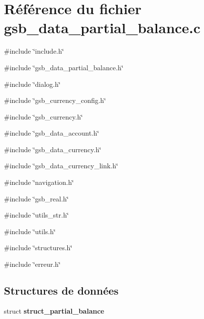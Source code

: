 \section{Référence du fichier gsb\_\-data\_\-partial\_\-balance.c}
\label{gsb__data__partial__balance_8c}
{\ttfamily \#include \char`\"{}include.h\char`\"{}}\par
{\ttfamily \#include \char`\"{}gsb\_\-data\_\-partial\_\-balance.h\char`\"{}}\par
{\ttfamily \#include \char`\"{}dialog.h\char`\"{}}\par
{\ttfamily \#include \char`\"{}gsb\_\-currency\_\-config.h\char`\"{}}\par
{\ttfamily \#include \char`\"{}gsb\_\-currency.h\char`\"{}}\par
{\ttfamily \#include \char`\"{}gsb\_\-data\_\-account.h\char`\"{}}\par
{\ttfamily \#include \char`\"{}gsb\_\-data\_\-currency.h\char`\"{}}\par
{\ttfamily \#include \char`\"{}gsb\_\-data\_\-currency\_\-link.h\char`\"{}}\par
{\ttfamily \#include \char`\"{}navigation.h\char`\"{}}\par
{\ttfamily \#include \char`\"{}gsb\_\-real.h\char`\"{}}\par
{\ttfamily \#include \char`\"{}utils\_\-str.h\char`\"{}}\par
{\ttfamily \#include \char`\"{}utils.h\char`\"{}}\par
{\ttfamily \#include \char`\"{}structures.h\char`\"{}}\par
{\ttfamily \#include \char`\"{}erreur.h\char`\"{}}\par
\subsection*{Structures de données}
\begin{DoxyCompactItemize}
\item 
struct {\bf struct\_\-partial\_\-balance}
\end{DoxyCompactItemize}
